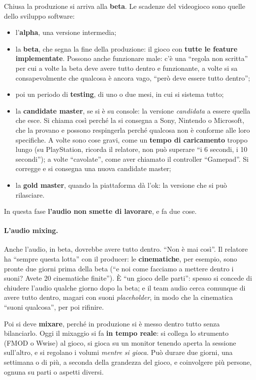 Chiusa la produzione si arriva alla \textbf{beta}. Le scadenze del videogioco sono
quelle dello sviluppo software:
\begin{itemize}
  \item l'\textbf{alpha}, una versione intermedia;
  \item la \textbf{beta}, che segna la fine della produzione: il gioco con
        \textbf{tutte le feature implementate}. Possono anche funzionare male:
        c'è una ``regola non scritta'' per cui a volte la beta deve avere tutto
        dentro e funzionante, a volte si sa consapevolmente che qualcosa è
        ancora vago, ``però deve essere tutto dentro'';
  \item poi un periodo di \textbf{testing}, di uno o due mesi, in cui si
        sistema tutto;
  \item la \textbf{candidate master}, se si è su console: la versione
        \emph{candidata} a essere quella che esce. Si chiama così perché la si
        consegna a Sony, Nintendo o Microsoft, che la provano e possono
        respingerla perché qualcosa non è conforme alle loro specifiche. A volte
        sono cose gravi, come un \textbf{tempo di caricamento} troppo lungo (su
        PlayStation, ricorda il relatore, non può superare ``i 6 secondi, i 10
        secondi''); a volte ``cavolate'', come aver chiamato il controller
        ``Gamepad''. Si corregge e si consegna una nuova candidate master;
  \item la \textbf{gold master}, quando la piattaforma dà l'ok: la versione che
        si può rilasciare.
\end{itemize}

In questa fase \textbf{l'audio non smette di lavorare}, e fa due cose.

\paragraph{L'audio mixing.} Anche l'audio, in beta, dovrebbe avere tutto dentro.
``Non è mai così''. Il relatore ha ``sempre questa lotta'' con il producer: le
\textbf{cinematiche}, per esempio, sono pronte due giorni prima della beta (``e
noi come facciamo a mettere dentro i suoni? Avete 20 cinematiche finite''). È
``un gioco delle parti'': spesso si concede di chiudere l'audio qualche giorno
dopo la beta; e il team audio cerca comunque di avere tutto dentro, magari con
suoni \emph{placeholder}, in modo che la cinematica ``suoni qualcosa'', per poi
rifinire.

Poi si deve \textbf{mixare}, perché in produzione si è messo dentro tutto senza
bilanciarlo. Oggi il mixaggio si fa \textbf{in tempo reale}: si collega lo
strumento (FMOD o Wwise) al gioco, si gioca su un monitor tenendo aperta la
sessione sull'altro, e si regolano i volumi \emph{mentre si gioca}. Può durare
due giorni, una settimana o di più, a seconda della grandezza del gioco, e
coinvolgere più persone, ognuna su parti o aspetti diversi.

